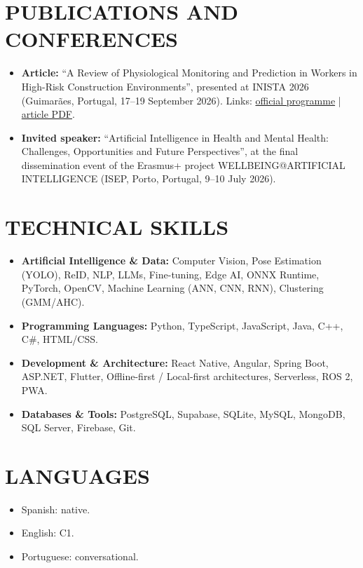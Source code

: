 \documentclass[10pt,a4paper]{article}
\begin{document}
\section*{PUBLICATIONS AND CONFERENCES}
\begin{itemize}
    \item \textbf{Article:} ``A Review of Physiological Monitoring and Prediction in Workers in High-Risk Construction Environments'', presented at INISTA 2026 (Guimarães, Portugal, 17--19 September 2026). Links: \href{https://inista2026.di.uminho.pt/pdf/INISTA\_Official\_Program.pdf}{official programme} | \href{https://drive.google.com/file/d/1Kh2M0t4dUh3F5vFrKY5sZMfaRxV1H2PT/view?usp=sharing}{article PDF}.
    \item \textbf{Invited speaker:} ``Artificial Intelligence in Health and Mental Health: Challenges, Opportunities and Future Perspectives'', at the final dissemination event of the Erasmus+ project WELLBEING@ARTIFICIAL INTELLIGENCE (ISEP, Porto, Portugal, 9--10 July 2026).
\end{itemize}

\section*{TECHNICAL SKILLS}
\begin{itemize}
    \item \textbf{Artificial Intelligence \& Data:} Computer Vision, Pose Estimation (YOLO), ReID, NLP, LLMs, Fine-tuning, Edge AI, ONNX Runtime, PyTorch, OpenCV, Machine Learning (ANN, CNN, RNN), Clustering (GMM/AHC).
    \item \textbf{Programming Languages:} Python, TypeScript, JavaScript, Java, C++, C\#, HTML/CSS.
    \item \textbf{Development \& Architecture:} React Native, Angular, Spring Boot, ASP.NET, Flutter, Offline-first / Local-first architectures, Serverless, ROS 2, PWA.
    \item \textbf{Databases \& Tools:} PostgreSQL, Supabase, SQLite, MySQL, MongoDB, SQL Server, Firebase, Git.
\end{itemize}

\section*{LANGUAGES}
\begin{itemize}
    \item Spanish: native.
    \item English: C1.
    \item Portuguese: conversational.
\end{itemize}
\end{document}
